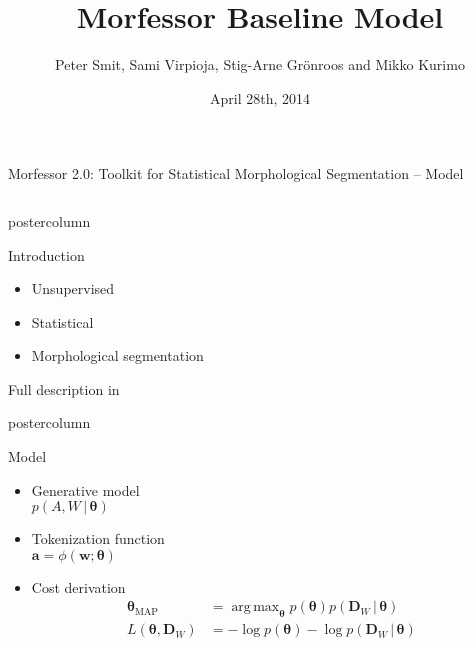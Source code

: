 \documentclass[final]{beamer} %
\title[Morfessor Model]{Morfessor Baseline Model}
\author[Smit et. al]{Peter Smit, Sami Virpioja, Stig-Arne Grönroos and Mikko Kurimo}
\institute[Aalto University]{Aalto University}
\date{April 28th, 2014}
\DeclareMathOperator*{\argmax}{arg\,max}
\newcommand{\seq}[1]{\boldsymbol{#1}}
\newcommand{\txt}[1]{\textrm{#1}}
\newcommand{\cost}{L}
\newcommand{\params}{\boldsymbol{\theta}}
\newcommand{\data}{\seq{D}}
\newcommand{\token}{\phi}
\newcommand{\vb}{\,|\,}
\begin{document}
  \begin{frame}{Morfessor 2.0: Toolkit for Statistical Morphological Segmentation -- Model} 
\begin{columns}

\begin{column}{.4\textwidth}
      \begin{beamercolorbox}[center,wd=\textwidth]{postercolumn}
 \begin{block}{Introduction}
              \begin{itemize}
              \item Unsupervised
		\item Statistical
		\item Morphological segmentation
              \end{itemize}              
Full description in  \citep{virpioja2013morfessor}    
        \end{block}
            

	\end{beamercolorbox}

      \begin{beamercolorbox}[center,wd=\textwidth]{postercolumn}
 \begin{block}{Model}
              \begin{itemize}
              \item Generative model\\
$p(A, W \vb \params)$
		\item Tokenization function\\
 $\seq{a} = \token(\seq{w}; \params)$
		\item Cost derivation\\
\begin{align*}\params_{\txt{MAP}}%
&= \argmax_{\params} p(\params) p(\data_W \vb \params)\\
\cost(\params, \data_W) &= -\log p(\params) - \log p(\data_W \vb \params)
\end{align*}
              \end{itemize}              
            \end{block}
            
	\end{beamercolorbox}


\end{column}
\end{columns}
\end{frame}
\end{document}
